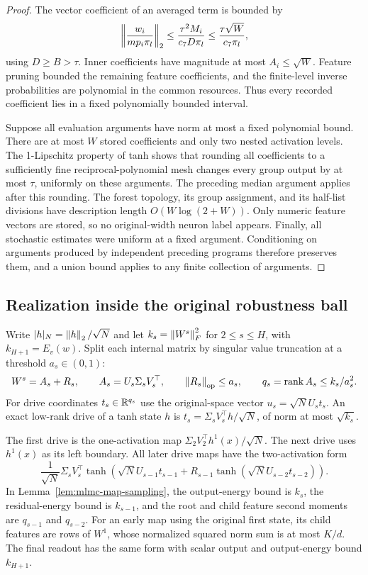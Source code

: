 \begin{proof}
The vector coefficient of an averaged term is bounded by
\[
 \left\|\frac{w_i}{mp_i\pi_l}\right\|_2
 \le\frac{\tau^2M_i}{c_7D\pi_l}
 \le\frac{\tau\sqrt W}{c_7\pi_l},
\]
using $D\ge B>\tau$. Inner coefficients have magnitude at most
$A_i\le\sqrt W$. Feature pruning bounded the remaining feature
coefficients, and the finite-level inverse probabilities are polynomial
in the common resources. Thus every recorded coefficient lies in a
fixed polynomially bounded interval.

Suppose all evaluation arguments have norm at most a fixed polynomial
bound. There are at most $W$ stored coefficients and only two nested
activation levels. The 1-Lipschitz property of tanh shows that rounding
all coefficients to a sufficiently fine reciprocal-polynomial mesh
changes every group output by at most $\tau$, uniformly on these
arguments. The preceding median argument applies after this rounding.
The forest topology, its group assignment, and its half-list divisions
have description length $O(W\log(2+W))$. Only numeric feature vectors
are stored, so no original-width neuron label appears. Finally, all
stochastic estimates were uniform at a fixed argument. Conditioning on
arguments produced by independent preceding programs therefore preserves
them, and a union bound applies to any finite collection of arguments.
\end{proof}

\subsection{Realization inside the original robustness ball}

Write $|h|_N=\left\|h\right\|_2/\sqrt N$ and let $k_s=\left\|W^s\right\|_F^2$ for
$2\le s\le H$, with $k_{H+1}=E_v(w)$. Split each internal matrix by
singular value truncation at a threshold $a_s\in(0,1)$:
\[
 W^s=A_s+R_s,\qquad A_s=U_s\Sigma_sV_s^\top,\qquad
 \left\|R_s\right\|_{\rm op}\le a_s,\qquad
 q_s=\operatorname{rank}A_s\le k_s/a_s^2.
\]
For drive coordinates $t_s\in\mathbb R^{q_s}$ use the original-space vector
$u_s=\sqrt N U_st_s$. An exact low-rank drive of a tanh state $h$ is
$t_s=\Sigma_sV_s^\top h/\sqrt N$, of norm at most $\sqrt{k_s}$.

The first drive is the one-activation map
$\Sigma_2V_2^\top h^1(x)/\sqrt N$. The next drive uses $h^1(x)$ as its
left boundary. All later drive maps have the two-activation form
\begin{equation}\label{eq:mlmc-drive-map}
 \frac1{\sqrt N}\Sigma_sV_s^\top
 \tanh\left(\sqrt N U_{s-1}t_{s-1}
       +R_{s-1}\tanh(\sqrt N U_{s-2}t_{s-2})\right).
\end{equation}
In Lemma~\ref{lem:mlmc-map-sampling}, the output-energy bound is $k_s$,
the residual-energy bound is $k_{s-1}$, and the root and child feature
second moments are $q_{s-1}$ and $q_{s-2}$. For an early map using the
original first state, its child features are rows of $W^1$, whose
normalized squared norm sum is at most $K/d$. The final readout has
the same form with scalar output and output-energy bound $k_{H+1}$.


